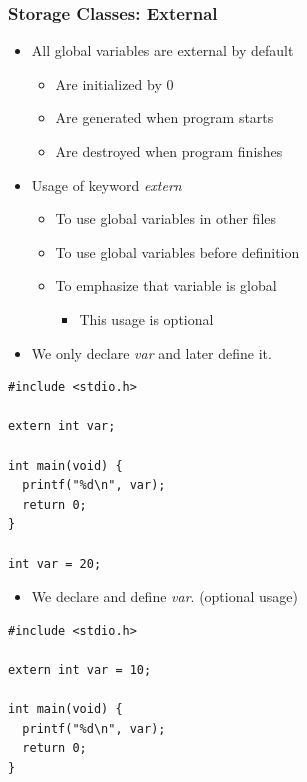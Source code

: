 \documentclass{../c-lecture}
\begin{document}
\begin{frame}
  \frametitle{Storage Classes: External}
  \begin{itemize}
    \item All global variables are external by default
    \begin{itemize}
      \item Are initialized by 0
      \item Are generated when program starts
      \item Are destroyed when program finishes
    \end{itemize}
  \item Usage of keyword \textit{\color{YellowOrange} extern}
    \begin{itemize}
      \item To use global variables in other files
      \item To use global variables before definition
      \item To emphasize that variable is global
      \begin{itemize}
        \item This usage is optional
      \end{itemize}
    \end{itemize}
  \end{itemize}
\end{frame}

\begin{frame}[fragile]
  \begin{itemize}
    \item We only declare \textit{\color{YellowOrange} var} and later define it.
  \end{itemize}
  \scriptsize
  \begin{verbatim}
#include <stdio.h>

extern int var;

int main(void) {
  printf("%d\n", var);
  return 0;
}

int var = 20;
  \end{verbatim}
  \begin{itemize}
    \item We declare and define \textit{\color{YellowOrange} var}. (optional usage)
  \end{itemize}
  \scriptsize
  \begin{verbatim}
#include <stdio.h>

extern int var = 10;

int main(void) {
  printf("%d\n", var);
  return 0;
}
  \end{verbatim}
\end{frame}
\end{document}
